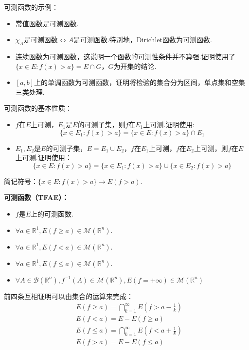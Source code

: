 \documentclass[bwprint, withoutpreface]{cumcmthesis}
\begin{document}
可测函数的示例：
\begin{itemize}[itemindent=2em]
	\item 常值函数是可测函数.
	\item $\chi_A$是可测函数$\Leftrightarrow$$A$是可测函数.特别地，Dirichlet函数为可测函数.
	\item 连续函数为可测函数，这说明一个函数的可测性条件并不算强.证明使用了$\{x \in E: f(x) > a\} = E \cap G$，$G$为开集的结论.
	\item $[a, b]$上的单调函数为可测函数，证明将检验的集合分为区间，单点集和空集三类处理.
\end{itemize}

可测函数的基本性质：
\begin{itemize}[itemindent=2em]
	\item $f$在$E$上可测，$E_1$是$E$的可测子集，则$f$在$E_1$上可测.证明使用:
	\begin{equation*}
		\{x \in E_1: f(x) > a\} = \{x \in E: f(x) > a\} \cap E_1
	\end{equation*}
	\item $E_1, E_2$是$E$的可测子集，$E = E_1 \cup E_2$，$f$在$E_1$上可测，$f$在$E_2$上可测，则$f$在$E$上可测.证明使用：
	\begin{equation*}
		\{x \in E: f(x) > a\} = \{x \in E_1: f(x) > a\} \cup \{x \in E_2: f(x) > a\}
	\end{equation*} 
\end{itemize}

简记符号：$\{x \in E: f(x) > a\} \to E(f > a)$.

\textbf{可测函数（TFAE）：}
\begin{itemize}[itemindent=2em]
	\item $f$是$E$上的可测函数.
	\item $\forall a \in \mathbb{R}^1, E(f \geqslant a) \in \mathcal{M}(\mathbb{R}^n)$.
	\item $\forall a \in \mathbb{R}^1, E(f < a) \in \mathcal{M}(\mathbb{R}^n)$.
	\item $\forall a \in \mathbb{R}^1, E(f \leqslant a) \in \mathcal{M}(\mathbb{R}^n)$.
	\item $\forall A \in \mathcal{B}(\mathbb{R}^n), f^{-1}(A) \in \mathcal{M}(\mathbb{R}^n), E(f = +\infty) \in \mathcal{M}(\mathbb{R}^n)$
\end{itemize}

前四条互相证明可以由集合的运算来完成：
\begin{align*}
	& E(f \geqslant a) = \bigcap_{k = 1}^{\infty}{E(f > a - \frac{1}{k})} \\
	& E(f < a) = E - E(f \geqslant a) \\
	& E(f \leqslant a) = \bigcap_{k = 1}^{\infty}{E(f < a + \frac{1}{k})} \\
	& E(f > a) = E - E(f \leqslant a)
\end{align*}
\end{document}

